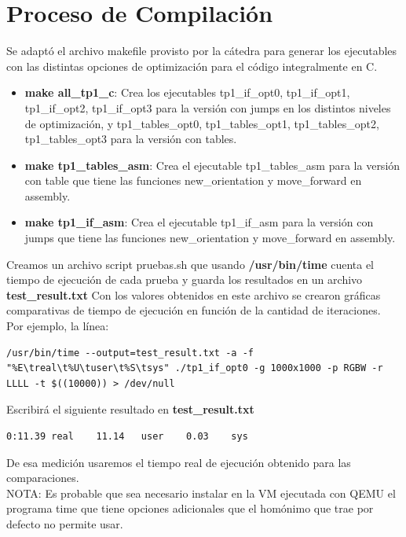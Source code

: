 \documentclass[a4paper, 10pt, twoside, notitlepage]{article}
\begin{document}
\newpage

\section{Proceso de Compilación}
Se adaptó el archivo makefile provisto por la cátedra para generar los ejecutables con las distintas opciones de optimización para el código integralmente en C.\\

\begin{itemize} 
\item[] \textbf{make all\_tp1\_c}: Crea los ejecutables tp1\_if\_opt0, tp1\_if\_opt1, tp1\_if\_opt2, tp1\_if\_opt3 para la versión con jumps en los distintos niveles de optimización, y tp1\_tables\_opt0, tp1\_tables\_opt1, tp1\_tables\_opt2, tp1\_tables\_opt3 para la versión con tables.
\item[] \textbf{make tp1\_tables\_asm}: Crea el ejecutable tp1\_tables\_asm para la versión con table que tiene las funciones new\_orientation y move\_forward en assembly.
\item[] \textbf{make tp1\_if\_asm}: Crea el ejecutable tp1\_if\_asm para la versión con jumps que tiene las funciones new\_orientation y move\_forward en assembly.
\end{itemize}
Creamos un archivo script pruebas.sh que usando \textbf{/usr/bin/time} cuenta el tiempo de ejecución de cada prueba y guarda los resultados en un archivo \textbf{test\_result.txt}
Con los valores obtenidos en este archivo se crearon gráficas comparativas de tiempo de ejecución en función de la cantidad de iteraciones.\\

Por ejemplo, la línea:

\scriptsize
\begin{verbatim}
/usr/bin/time --output=test_result.txt -a -f "%E\treal\t%U\tuser\t%S\tsys" ./tp1_if_opt0 -g 1000x1000 -p RGBW -r LLLL -t $((10000)) > /dev/null
\end{verbatim}
\normalsize
Escribirá el siguiente resultado en \textbf{test\_result.txt}

\scriptsize
\begin{verbatim}
0:11.39	real	11.14	user	0.03	sys
\end{verbatim}
\normalsize

De esa medición usaremos el tiempo real de ejecución obtenido para las comparaciones.\\
NOTA: Es probable que sea necesario instalar en la VM ejecutada con QEMU el programa time que tiene opciones adicionales que el homónimo que trae por defecto no permite usar.\\
\end{document}
